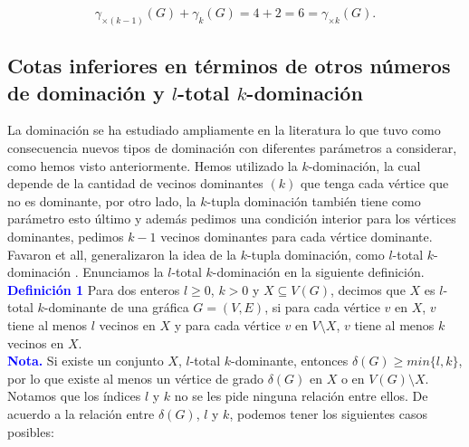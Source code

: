 \documentclass{article}
\begin{document}
$$\gamma_{\times (k-1)}(G)+\gamma_{k}(G) = 4+2=6=\gamma_{\times k}(G).$$

\newpage

	
\subsection{Cotas inferiores en términos de otros números de dominación y \texorpdfstring{$l$}{l}-total \texorpdfstring{$k$}{k}-dominación}


La dominación se ha estudiado ampliamente en la literatura lo que tuvo como consecuencia nuevos tipos de dominación con diferentes parámetros a considerar, como hemos visto anteriormente. Hemos utilizado la $k$-dominación, la cual depende de la cantidad de vecinos dominantes $(k)$ que tenga cada vértice que no es dominante, por otro lado, la $k$-tupla dominación también tiene como parámetro esto último y además pedimos una condición interior para los vértices dominantes, pedimos $k-1$ vecinos dominantes para cada vértice dominante. Favaron et all, generalizaron la idea de la $k$-tupla dominación, como $l$-total $k$-dominación \cite{favaron2001domination}. Enunciamos la $l$-total $k$-dominación en la siguiente definición.\\

	
	

\textcolor{blue}{\textbf{Definición 1}} Para dos enteros $l \ge 0$, $k>0$ y $X\subseteq V(G)$, decimos que $X$ es $l$-total $k$-dominante de una gráfica $G=(V,E)$, si para cada vértice $v$ en $X$, $v$ tiene al menos $l$ vecinos en $X$ y para cada vértice $v$ en $V \setminus X$, $v$ tiene al menos $k$ vecinos en $X$. \\

\textcolor{blue}{\textbf{Nota.}} Si existe un conjunto $X$, $l$-total $k$-dominante, entonces $\delta(G) \geq min\{l,k\}$, por lo que existe al menos un vértice de grado $\delta(G)$ en $X$ o en $V(G) \setminus X$. Notamos que los índices $l$ y $k$ no se les pide ninguna relación entre ellos. De acuerdo a la relación entre $\delta(G)$, $l$ y $k$, podemos tener los siguientes casos posibles:\\
\end{document}
